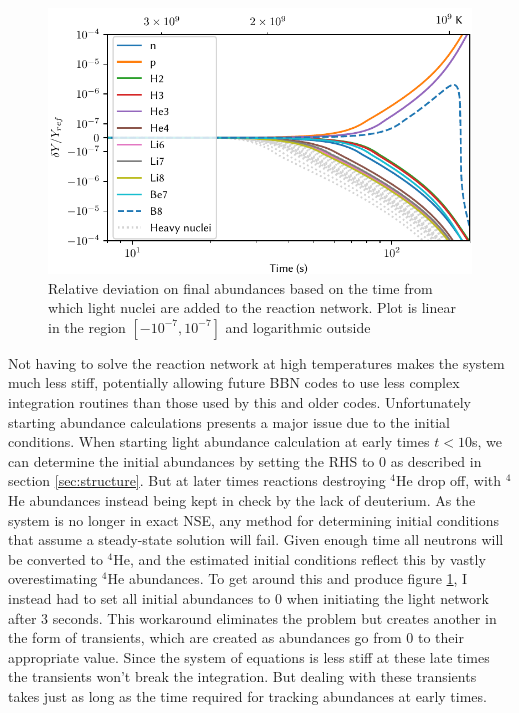 \begin{figure}[ht]
    \includegraphics[width=5.1in]{figures/midnettime.pdf}
    \caption{Relative deviation on final abundances based on the time from which light nuclei are added to the reaction network. Plot is linear in the region $[-10^{-7},10^{-7}]$ and logarithmic outside}
    \label{fig:midnettime}
\end{figure}
Not having to solve the reaction network at high temperatures makes the system much less stiff, potentially allowing future BBN codes to use less complex integration routines than those used by this and older codes. Unfortunately starting abundance calculations presents a major issue due to the initial conditions. When starting light abundance calculation at early times $t<10$s, we can determine the initial abundances by setting the RHS to 0 as described in section \ref{sec:structure}. But at later times reactions destroying ${}^4$He drop off, with ${}^4$He abundances instead being kept in check by the lack of deuterium. As the system is no longer in exact NSE, any method for determining initial conditions that assume a steady-state solution will fail. Given enough time all neutrons will be converted to ${}^4$He, and the estimated initial conditions reflect this by vastly overestimating ${}^4$He abundances. To get around this and produce figure \ref{fig:midnettime}, I instead had to set all initial abundances to 0 when initiating the light network after 3 seconds. This workaround eliminates the problem but creates another in the form of transients, which are created as abundances go from 0 to their appropriate value. Since the system of equations is less stiff at these late times the transients won't break the integration. But dealing with these transients takes just as long as the time required for tracking abundances at early times. 


